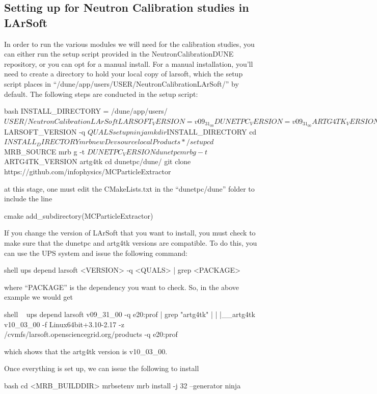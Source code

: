 \documentclass[8pt]{refart}
\begin{document}
\subsection{Setting up for Neutron Calibration studies in LArSoft}
In order to run the various modules we will need for the calibration studies, you can either run the setup script provided in the NeutronCalibrationDUNE repository, or you can opt for a manual install.  For a manual installation, you'll need to create a directory to hold your local copy of larsoft, which the setup script places in ``/dune/app/users/USER/NeutronCalibrationLArSoft/'' by default.  The following steps are conducted in the setup script:
\begin{code}{bash}
INSTALL_DIRECTORY = /dune/app/users/$USER/NeutronCalibrationLArSoft
LARSOFT_VERSION   = v09_31_00
DUNETPC_VERSION   = v09_31_00
ARTG4TK_VERSION   = v10_03_00
QUALS             = e20:prof
source /cvmfs/dune.opensciencegrid.org/products/dune/setup_dune.sh
setup larsoft $LARSOFT_VERSION -q $QUALS
setup ninja
mkdir $INSTALL_DIRECTORY
cd $INSTALL_DIRECTORY
mrb newDev
source localProducts*/setup
cd $MRB_SOURCE
mrb g -t $DUNETPC_VERSION dunetpc
mrb g -t $ARTG4TK_VERSION artg4tk
cd dunetpc/dune/
git clone https://github.com/infophysics/MCParticleExtractor
\end{code}
at this stage, one must edit the CMakeLists.txt in the ``dunetpc/dune'' folder to include the line
\begin{code}{cmake}
add_subdirectory(MCParticleExtractor)
\end{code}
If you change the version of LArSoft that you want to install, you must check to make sure that the dunetpc and artg4tk versions are compatible.  To do this, you can use the UPS system and issue the following command:
\begin{code}{shell}
ups depend larsoft <VERSION> -q <QUALS> | grep <PACKAGE>
\end{code}
where ``PACKAGE'' is the dependency you want to check.  So, in the above example we would get
\begin{code}{shell}
~ ups depend larsoft v09_31_00 -q e20:prof | grep "artg4tk"
|        |  |__artg4tk v10_03_00 -f Linux64bit+3.10-2.17 -z /cvmfs/larsoft.opensciencegrid.org/products -q e20:prof
\end{code}
which shows that the artg4tk version is v10\_03\_00.

Once everything is set up, we can issue the following to install
\begin{code}{bash}
cd <MRB_BUILDDIR>
mrbsetenv
mrb install -j 32 --generator ninja
\end{code}
\end{document}
